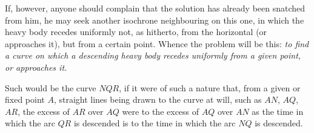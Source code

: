 \documentclass{article}
\begin{document}
If, however, anyone should complain that the solution has already been snatched from him, he may
seek another isochrone neighbouring on this one, in which the heavy body recedes uniformly not, as
hitherto, from the horizontal (or approaches it), but from a certain point. Whence the problem
will be this: \emph{to find a curve on which a descending heavy body recedes uniformly from a
given point, or approaches it.}

Such would be the curve $NQR$, if it were of such a nature that, from a given or fixed point $A$,
straight lines being drawn to the curve at will, such as $AN$, $AQ$, $AR$, the excess of $AR$
over $AQ$ were to the excess of $AQ$ over $AN$ as the time in which the arc $QR$ is descended is
to the time in which the arc $NQ$ is descended.
\end{document}
